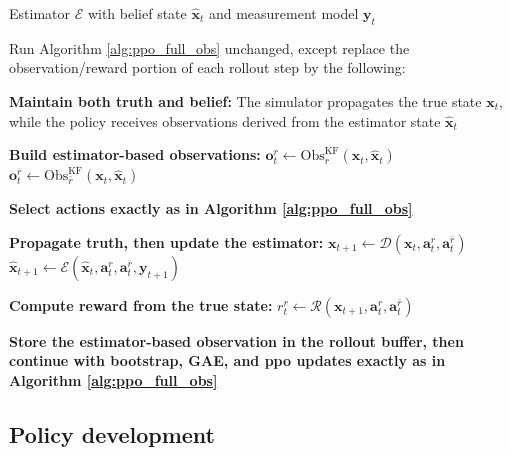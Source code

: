 \begin{algorithm}[H]
\caption{KF-On Modifications to Algorithm \ref{alg:ppo_full_obs}}
\label{alg:ppo_kf_on}
\begin{algorithmic}[1]
\Require Estimator $\mathcal{E}$ with belief state $\hat{\mathbf{x}}_t$ and measurement model $\mathbf{y}_t$

\State Run Algorithm \ref{alg:ppo_full_obs} unchanged, except replace the observation/reward portion of each rollout step by the following:

\State \textbf{Maintain both truth and belief:}
\State \hspace{1em} The simulator propagates the true state $\mathbf{x}_t$, while the policy receives observations derived from the estimator state $\hat{\mathbf{x}}_t$

\State \textbf{Build estimator-based observations:}
\State \hspace{1em} $\mathbf{o}_t^r \leftarrow \mathrm{Obs}^{\mathrm{KF}}_r(\mathbf{x}_t,\hat{\mathbf{x}}_t)$
\State \hspace{1em} $\mathbf{o}_t^{\bar r} \leftarrow \mathrm{Obs}^{\mathrm{KF}}_{\bar r}(\mathbf{x}_t,\hat{\mathbf{x}}_t)$

\State \textbf{Select actions exactly as in Algorithm \ref{alg:ppo_full_obs}}

\State \textbf{Propagate truth, then update the estimator:}
\State \hspace{1em} $\mathbf{x}_{t+1} \leftarrow \mathcal{D}(\mathbf{x}_t,\mathbf{a}_t^r,\mathbf{a}_t^{\bar r})$
\State \hspace{1em} $\hat{\mathbf{x}}_{t+1} \leftarrow \mathcal{E}(\hat{\mathbf{x}}_t,\mathbf{a}_t^r,\mathbf{a}_t^{\bar r},\mathbf{y}_{t+1})$

\State \textbf{Compute reward from the true state:}
\State \hspace{1em} $r_t^r \leftarrow \mathcal{R}(\mathbf{x}_{t+1},\mathbf{a}_t^r,\mathbf{a}_t^{\bar r})$

\State \textbf{Store the estimator-based observation in the rollout buffer, then continue with bootstrap, GAE, and \acs{ppo} updates exactly as in Algorithm \ref{alg:ppo_full_obs}}
\end{algorithmic}
\end{algorithm}


\subsection{Policy development}
\label{subsec:policy-development}


